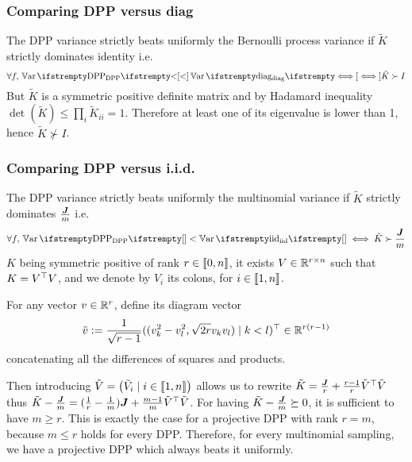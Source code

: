 \subsubsection{Comparing DPP versus diag}
The DPP variance strictly beats uniformly the Bernoulli process variance if $\tilde K$ strictly dominates identity i.e. 
\begin{equation}
	\forall \query, \, \Var{\textrm{DPP}} < \Var{\textrm{diag}} \iff \tilde K \succ I
\end{equation}
But $\tilde K$ is a symmetric positive definite matrix and by Hadamard inequality $\det( \tilde K) \leq \prod_{i} \tilde K_{ii}= 1$. Therefore at least one of its eigenvalue is lower than 1, hence $\tilde K \nsucc I$.

\subsubsection{Comparing DPP versus i.i.d.}
The DPP variance strictly beats uniformly the multinomial variance if $\tilde K$ strictly dominates $\frac{\boldsymbol{J}}{m}$ i.e. 
\begin{equation}
	\forall \query, \, \Var{\textrm{DPP}}{} < \Var{\textrm{iid}}{} \iff \tilde K \succ \frac{\moones}{m}
\end{equation}
$K$ being symmetric positive of rank $r \in \llbracket 0,n \rrbracket$, it exists $V \in \mathbb{R}^{r \times n}$ such that $K = V^\top V$, and we denote by $V_i$ its colons, for $i \in \llbracket 1,n \rrbracket$.

For any vector $v \in \mathbb{R}^{r}$, \cite{copenhaver2013diagramvectors} define its diagram vector 
$$\tilde v :=
 \frac{1}{\sqrt{r-1}} ((v_k^{2}-v_l^{2} , \sqrt{2 r} v_k v_l ) \mid k<l)^\top \in \mathbb{R}^{r(r-1)}$$
concatenating all the differences of squares and products.

Then introducing $\tilde V = \begin{pmatrix}\tilde V_i \mid i\in\llbracket 1,n \rrbracket\end{pmatrix}
$ allows us to rewrite $\tilde K = \frac{\boldsymbol{J}}{r} + \frac{r-1}{r} \tilde V^\top \tilde V$ thus $\tilde K - \frac{\boldsymbol{J}}{m} = (\frac{1}{r}-\frac{1}{m})\boldsymbol{J} + \frac{m-1}{m} \tilde V^\top \tilde V$. For having $\tilde K - \frac{\boldsymbol{J}}{m}\succeq 0$, it is sufficient to have $m \geq r$. This is exactly the case for a projective DPP with rank $r = m$, because $m \leq r$ holds for every DPP. Therefore, for every multinomial sampling, we have a projective DPP which always beats it uniformly.




